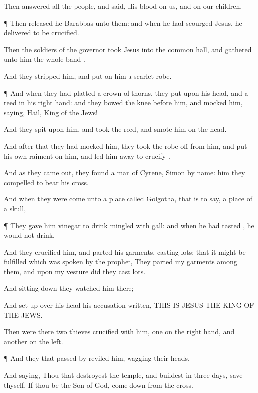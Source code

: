 {Then
answered
all the
people, and
said,
His
blood
{}
on
us,
and
on
our
children.


\par }{\PP {}¶
Then released
he
Barabbas unto
them:
and when he had
scourged
Jesus, he
delivered
{}
to be
crucified.

Then the
soldiers of the
governor
took
Jesus
into the common
hall, and
gathered
unto
him the
whole
band
{}.

And they
stripped
him, and put
on
him a
scarlet
robe.


\par }{\PP {}¶
And when they had
platted a
crown
of
thorns, they
put
{}
upon
his
head,
and a
reed
in
his right
hand:
and they bowed the
knee
before
him, and
mocked
him,
saying,
Hail,
King of the
Jews!

And they
spit
upon
him, and
took the
reed,
and
smote
him
on the
head.

And
after that they had
mocked
him, they
took the
robe
off from
him,
and
put his
own
raiment
on
him,
and
led
him
away
to
crucify
{}.

And as they came
out, they
found a
man of
Cyrene,
Simon by
name:
him they
compelled
to
bear
his
cross.

And when they were
come
unto a
place
called
Golgotha,
that
is to
say, a
place of a
skull,


\par }{\PP {}¶ They
gave
him
vinegar to
drink
mingled
with
gall:
and when he had
tasted
{}, he
would
not
drink.

And they
crucified
him, and
parted
his
garments,
casting
lots:
that it might be
fulfilled which was
spoken
by the
prophet, They
parted
my
garments among
them,
and
upon
my
vesture did they
cast
lots.

And sitting
down they
watched
him
there;

And set
up
over
his
head
his
accusation
written,
THIS
IS
JESUS THE
KING OF THE
JEWS.

Then were
there
two
thieves crucified
with
him,
one
on the right
hand,
and
another
on the
left.


\par }{\PP {}¶
And they that passed
by
reviled
him,
wagging
their
heads,

And
saying, Thou that
destroyest the
temple,
and
buildest
{}
in
three
days,
save
thyself.
If thou
be the
Son of
God, come
down
from the
cross.

}
